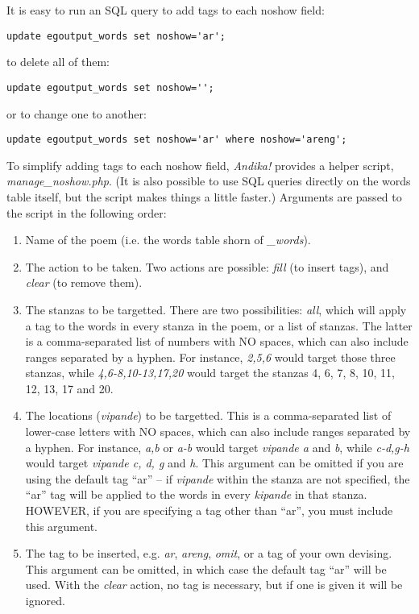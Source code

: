 It is easy to run an SQL query to add tags to each noshow field:

\verb|update egoutput_words set noshow='ar';|

to delete all of them:

\verb|update egoutput_words set noshow='';|

or to change one to another:

\verb|update egoutput_words set noshow='ar' where noshow='areng';|

To simplify adding tags to each noshow field, \textit{Andika!} provides a helper script, \textit{manage_noshow.php}.  (It is also possible to use SQL queries directly on the words table itself, but the script makes things a little faster.)  Arguments are passed to the script in the following order:
\begin{enumerate}
\item Name of the poem (i.e. the words table shorn of \textit{_words}).
\item The action to be taken.  Two actions are possible: \textit{fill} (to insert tags), and \textit{clear} (to remove them).
\item The stanzas to be targetted.  There are two possibilities: \textit{all}, which will apply a tag to the words in every stanza in the poem, or a list of stanzas.  The latter is a comma-separated list of numbers with NO spaces, which can also include ranges separated by a hyphen.  For instance, \textit{2,5,6} would target those three stanzas, while \textit{4,6-8,10-13,17,20} would target the stanzas 4, 6, 7, 8, 10, 11, 12, 13, 17 and 20. 
\item The locations (\textit{vipande}) to be targetted.  This is a comma-separated list of lower-case letters with NO spaces, which can also include ranges separated by a hyphen.  For instance, \textit{a,b} or \textit{a-b} would target \textit{vipande a} and \textit{b}, while \textit{c-d,g-h} would target \textit{vipande c, d, g} and \textit{h}.  This argument can be omitted if you are using the default tag ``ar'' -- if \textit{vipande} within the stanza are not specified, the ``ar'' tag will be applied to the words in every \textit{kipande} in that stanza.  HOWEVER, if you are specifying a tag other than ``ar'', you must include this argument.
\item  The tag to be inserted, e.g. \textit{ar}, \textit{areng}, \textit{omit}, or a tag of your own devising.  This argument can be omitted, in which case the default tag ``ar'' will be used.  With the \textit{clear} action, no tag is necessary, but if one is given it will be ignored.
\end{enumerate}

